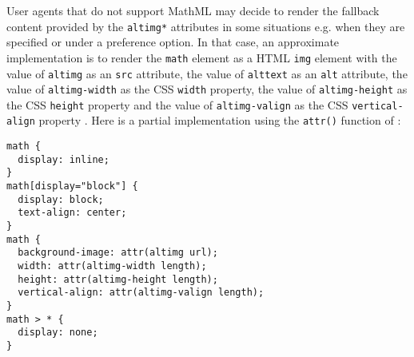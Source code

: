 User agents that do not support MathML may decide to
render the fallback content provided by the {\tt altimg*} attributes in some
situations e.g. when they are specified or
under a preference option. In that case, an approximate implementation is to
render the {\tt math} element as a HTML {\tt img} element with the
value of {\tt altimg} as an {\tt src} attribute, the value of
{\tt alttext} as an {\tt alt} attribute, the value of {\tt altimg-width} as
the CSS {\tt width} property, the value of {\tt altimg-height} as
the CSS {\tt height} property and the value of {\tt altimg-valign} as
the CSS {\tt vertical-align} property \cite{HTML5} \cite{CSS2}. Here is a
partial implementation using the {\tt attr()} function of \cite{CSS3Values}:
%
\begin{lstlisting}
math {
  display: inline;
}
math[display="block"] {
  display: block;
  text-align: center;
}
math {
  background-image: attr(altimg url);
  width: attr(altimg-width length);
  height: attr(altimg-height length);
  vertical-align: attr(altimg-valign length);
}
math > * {
  display: none;
}
\end{lstlisting}
